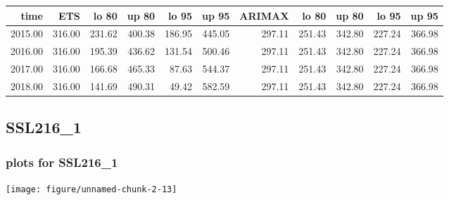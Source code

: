 \documentclass[10pt,a4paper]{article}\usepackage[]{graphicx}\usepackage[]{color}
\makeatletter
\def\maxwidth{ %
  \ifdim\Gin@nat@width>\linewidth
    \linewidth
  \else
    \Gin@nat@width
  \fi
}
\newcommand{\AaA}{\_}
\makeatother
\begin{document}
\begin{table}[ht]
\centering
\begin{tabular}{rrrrrrrrrrr}
  \hline
time & ETS  & lo 80 & up 80 & lo 95 & up 95 & ARIMAX  & lo 80 & up 80 & lo 95 & up 95 \\ 
  \hline
2015.00 & 316.00 & 231.62 & 400.38 & 186.95 & 445.05 & 297.11 & 251.43 & 342.80 & 227.24 & 366.98 \\ 
  2016.00 & 316.00 & 195.39 & 436.62 & 131.54 & 500.46 & 297.11 & 251.43 & 342.80 & 227.24 & 366.98 \\ 
  2017.00 & 316.00 & 166.68 & 465.33 & 87.63 & 544.37 & 297.11 & 251.43 & 342.80 & 227.24 & 366.98 \\ 
  2018.00 & 316.00 & 141.69 & 490.31 & 49.42 & 582.59 & 297.11 & 251.43 & 342.80 & 227.24 & 366.98 \\ 
   \hline
\end{tabular}
\end{table}

\newpage
\subsection{SSL216\AaA 1}
\subsubsection{plots for SSL216\AaA 1}

\texttt{[image: figure/unnamed-chunk-2-13]} 

\newpage
\end{document}
